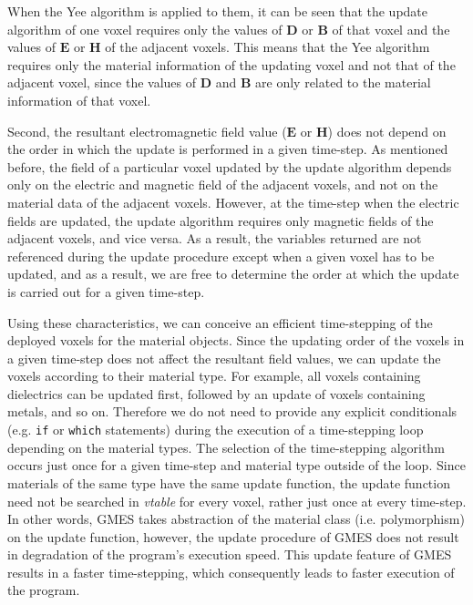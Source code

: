 When the Yee algorithm is applied to them, it can be seen that the update algorithm of one voxel requires only the values of $\mathbf D$ or $\mathbf B$ of that voxel and the values of $\mathbf E$ or $\mathbf H$ of the adjacent voxels. This means that the Yee algorithm requires only the material information of the updating voxel and not that of the adjacent voxel, since the values of $\mathbf D$ and $\mathbf B$ are only related to the material information of that voxel.

Second, the resultant electromagnetic field value ($\mathbf E$ or $\mathbf H$) does not depend on the order in which the update is performed in a given time-step. As mentioned before, the field of a particular voxel updated by the update algorithm depends only on the electric and magnetic field of the adjacent voxels, and not on the material data of the adjacent voxels. However, at the time-step when the electric fields are updated, the update algorithm requires only magnetic fields of the adjacent voxels, and vice versa. As a result, the variables returned are not referenced during the update procedure except when a given voxel has to be updated, and as a result, we are free to determine the order at which the update is carried out for a given time-step.

Using these characteristics, we can conceive an efficient time-stepping of the deployed voxels for the material objects. Since the updating order of the voxels in a given time-step does not affect the resultant field values, we can update the voxels according to their material type. For example, all voxels containing dielectrics can be updated first, followed by an update of voxels containing metals, and so on. Therefore we do not need to provide any explicit conditionals (e.g. \texttt{if} or \texttt{which} statements) during the execution of a time-stepping loop depending on the material types. The selection of the time-stepping algorithm occurs just once for a given time-step and material type outside of the loop. Since materials of the same type have the same update function, the update function need not be searched in \emph{vtable} for every voxel, rather just once at every time-step. In other words, GMES takes abstraction of the material class (i.e. polymorphism) on the update function, however, the update procedure of GMES does not result in degradation of the program's execution speed. This update feature of GMES results in a faster time-stepping, which consequently leads to faster execution of the program.

